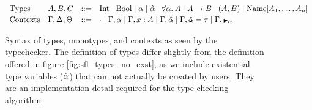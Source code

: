 \begin{figure}[h]
  \centering
  \begin{minipage}{\textwidth}
  \[
      \begin{array}{llcl}
      \text{Types} & A, B, C & \bnfas &
            \Inttype \bnfalt \Booltype \bnfalt \alpha \bnfalt \ahat \bnfalt 
            \alltype{\alpha}{A} \bnfalt A \arr B \bnfalt
            (A, B) \bnfalt
            \Unionname[A_1, \dots, A_n]
      \\[2pt]
      \text{Contexts} & \Gamma, \Delta, \Theta & \bnfas &
                  \cdot
                  \bnfalt \Gamma, \alpha 
                  \bnfalt \Gamma, x:A
                  \bnfalt \Gamma, \ahat
                  \bnfalt \Gamma, \hypeq{\ahat}{\tau}
                  \bnfalt \Gamma, \MonnierComma{\ahat}
      \end{array}
  \]
  
  \captionsetup{justification=centering}\caption{Syntax of types, monotypes, and contexts as seen by the typechecker. The definition of types differ slightly from the definition offered in figure \ref{fig:sfl_types_no_exst}, as we include existential type variables ($\hat{\alpha}$) that can not actually be created by users. They are an implementation detail required for the type checking algorithm}


\end{minipage}
\end{figure}
